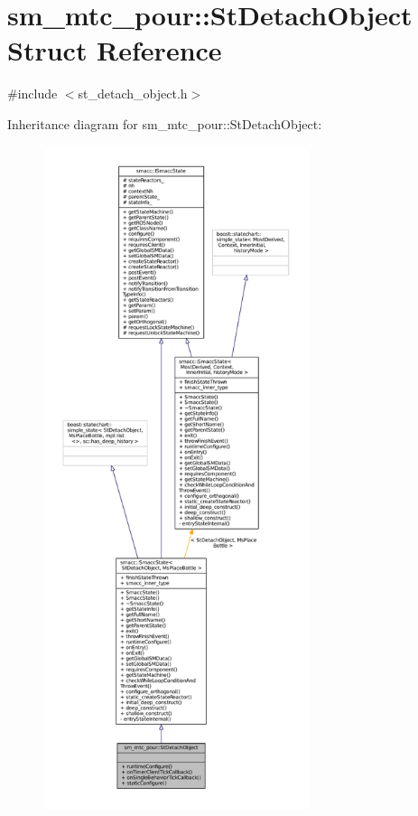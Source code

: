 \hypertarget{structsm__mtc__pour_1_1StDetachObject}{}\section{sm\+\_\+mtc\+\_\+pour\+:\+:St\+Detach\+Object Struct Reference}
\label{structsm__mtc__pour_1_1StDetachObject}


{\ttfamily \#include $<$st\+\_\+detach\+\_\+object.\+h$>$}



Inheritance diagram for sm\+\_\+mtc\+\_\+pour\+:\+:St\+Detach\+Object\+:
\nopagebreak
\begin{figure}[H]
\begin{center}
\leavevmode
\includegraphics[height=550pt]{structsm__mtc__pour_1_1StDetachObject__inherit__graph}
\end{center}
\end{figure}


